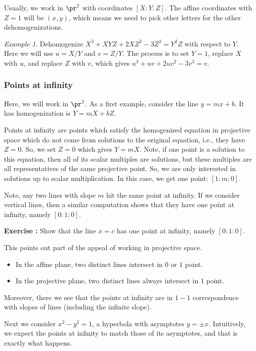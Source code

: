 \documentclass[12pt]{amsart}
\newcounter{probs}
\newenvironment{prob}{%
  \refstepcounter{probs}
  \par\medskip\noindent\textbf{Exercise \theprobs:} }{\par\medskip}
\theoremstyle{plain}
\theoremstyle{definition}
\theoremstyle{remark}
\newtheorem*{exam}{Example}
\begin{document}
Usually, we work in $\pr^2$ with coordinates $[X:Y:Z]$.  The affine
coordinates with $Z=1$ will be $(x,y)$, which means we need to pick
other letters for the other dehomogenizations.
\begin{exam}
  Dehomogenize $X^3+XYZ + 2XZ^2 -3Z^3 = Y^2Z$ with respect to $Y$.
  Here we will use $u=X/Y$ and $v=Z/Y$.  The process is to set $Y=1$,
  replace $X$ with $u$, and replace $Z$ with $v$, which gives
  $u^3+uv+2uv^2-3v^3 = v$.
\end{exam}

\subsubsection{Points at infinity}

Here, we will work in $\pr^2$.  As a first example, consider
the line $y=mx+b$.  It has homogenization is $Y=mX+bZ$.

Points at infinity are points which satisfy the homogenized equation
in projective space which do not come from solutions to the
original equation, i.e., they have $Z=0$.  So, we set $Z=0$ which
gives $Y=mX$.  Note, if one point is a solution to
this equation, then all of its scalar multiples are solutions, but
these multiples are all representatives of the same projective point.
So, we are only interested in solutions up to scalar multiplication.
In this case, we get one point: $[1:m:0]$.

Note, any two lines with slope $m$ hit the same point at infinity.  If
we consider vertical lines, then a similar computation shows that they
have one point at infinity, namely $[0:1:0]$.
\begin{prob}
  Show that the line $x=c$ has one point at infinity, namely
  $[0:1:0]$.
\end{prob}

This points out part of the appeal of working in projective space.
\begin{itemize}
\item  In the affine plane, two distinct lines intersect in $0$ or $1$
  point.
\item  In the projective plane, two distinct lines always intersect in $1$
  point.
\end{itemize}
Moreover, there we see that the points at infinity are in $1-1$
correspondence with slopes of lines (including the infinite slope).

Next we consider $x^2-y^2=1$, a hyperbola with asymptotes $y=\pm x$.
Intuitively, we expect the points at infinity to match those of its
asymptotes, and that is exactly what happens.  
\end{document}
